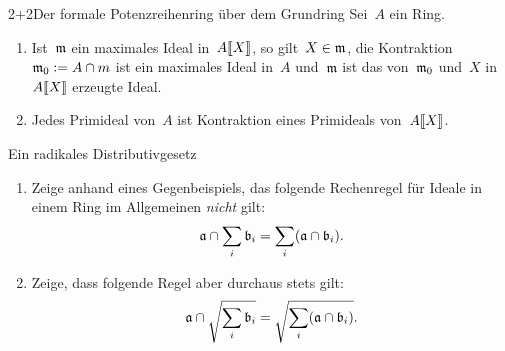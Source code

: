 \documentclass[entwurf]{uebblatt}
\begin{document}

\begin{aufgabe}{2+2}{Der formale Potenzreihenring über dem Grundring}
Sei~$A$ ein Ring.
\begin{enumerate}
\item Ist~$\mathfrak{m}$ ein maximales Ideal in~${A}\llbracket{X}\rrbracket$, so gilt~$X \in \mathfrak{m}$, die
Kontraktion~$\mathfrak{m}_0 \vcentcolon= A \cap m$ ist ein maximales Ideal in~$A$ und~$\mathfrak{m}$
ist das von~$\mathfrak{m}_0$ und~$X$ in~${A}\llbracket{X}\rrbracket$ erzeugte Ideal.
\item Jedes Primideal von~$A$ ist Kontraktion eines Primideals von~${A}\llbracket{X}\rrbracket$.
\end{enumerate}
\end{aufgabe}

\begin{aufgabe}{}{Ein radikales Distributivgesetz}
\begin{enumerate}
\item Zeige anhand eines Gegenbeispiels, das folgende Rechenregel für Ideale in
einem Ring im Allgemeinen \emph{nicht} gilt:
\[ \mathfrak{a} \cap \sum_i \mathfrak{b}_i = \sum_i (\mathfrak{a} \cap \mathfrak{b}_i). \]
\item Zeige, dass folgende Regel aber durchaus stets gilt:
\[ \mathfrak{a} \cap \sqrt{\sum_i \mathfrak{b}_i} = \sqrt{\sum_i (\mathfrak{a} \cap \mathfrak{b}_i)}. \]
\end{enumerate}
\end{aufgabe}
\end{document}
